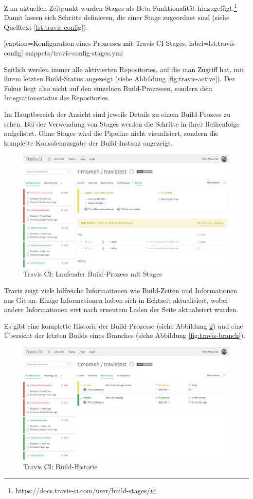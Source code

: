 Zum aktuellen Zeitpunkt wurden Stages als Beta-Funktionalität hinzugefügt.\footnote{https://docs.travis-ci.com/user/build-stages/} Damit lassen sich Schritte definieren, die einer Stage zugeordnet sind (siehe Quelltext \ref{lst:travis-config}).


  [caption={Konfiguration eines Prozesses mit Travis CI Stages},
  label={lst:travis-config}]
  {snippets/travis-config-stages.yml}

Seitlich werden immer alle aktivierten Repositories, auf die man Zugriff hat, mit ihrem letzten Build-Status angezeigt (siehe Abbildung \ref{fig:travis-active}). Der Fokus liegt also nicht auf den einzelnen Build-Prozessen, sondern dem Integrationsstatus des Repositories.

Im Hauptbereich der Ansicht sind jeweils Details zu einem Build-Prozess zu sehen. Bei der Verwendung von Stages werden die Schritte in ihrer Reihenfolge aufgelistet. Ohne Stages wird die Pipeline nicht visualisiert, sondern die komplette Konsolenausgabe der Build-Instanz angezeigt.

\begin{figure}[h]
  \caption{Travis CI: Laufender Build-Prozess mit Stages}
  \label{fig:travis-running-build}
  \includegraphics[width=.8\textwidth]{assets/travis-running-build}
\end{figure}

Travis zeigt viele hilfreiche Informationen wie Build-Zeiten und Informationen aus Git an. Einige Informationen haben sich in Echtzeit aktualisiert, wobei andere Informationen erst nach erneutem Laden der Seite aktualisiert wurden.

Es gibt eine komplette Historie der Build-Prozesse (siehe Abbildung \ref{fig:travis-history}) und eine Übersicht der letzten Builds eines Branches (siehe Abbildung \ref{fig:travis-branch}).

\begin{figure}[h]
  \caption{Travis CI: Build-Historie}
  \label{fig:travis-history}
  \includegraphics[width=.8\textwidth]{assets/travis-history}
\end{figure}

